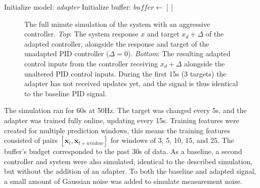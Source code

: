 \begin{algorithm}
    \SetAlgoLined
    \caption{Target adaptation}
    \label{alg:toy-problem}


    Initialize model:  \textit{adapter}\;
    Initialize buffer: $\textit{buffer} \gets []$\;
\end{algorithm}

\begin{figure}
    \centering
    
    \vspace*{-2em}
    \caption{The full minute simulation of the system with an aggressive controller. \emph{Top}: The system response $x$ and target $x_d+\Delta$ of the adapted controller, alongside the response and target of the unadapted PID controller ($\Delta=0$).
    \emph{Bottom}: The resulting adapted control inputs from the controller receiving $x_d+\Delta$ alongside the unaltered PID control inputs.
    During the first 15\si{\second} (3 targets) the adapter has not received updates yet, and the signal is thus identical to the baseline PID signal.}
    \label{fig:toy-plot}
\end{figure}

The simulation ran for 60\si{\second} at 50\si{\hertz}.
The target was changed every 5\si{\second}, and the adapter was trained fully online, updating every 15\si{\second}.
Training features were created for multiple prediction windows, this means the training features consisted of pairs $[\mathbf{x}_t, \mathbf{x}_{t+\textit{window}}]$ for windows of 3, 5, 10, 15, and 25.
The buffer's budget corresponded to the past 30\si{\second} of data.
As a baseline, a second controller and system were also simulated, identical to the described simulation, but without the addition of an adapter.
To both the baseline and adapted signal, a small amount of Gaussian noise was added to simulate measurement noise.

